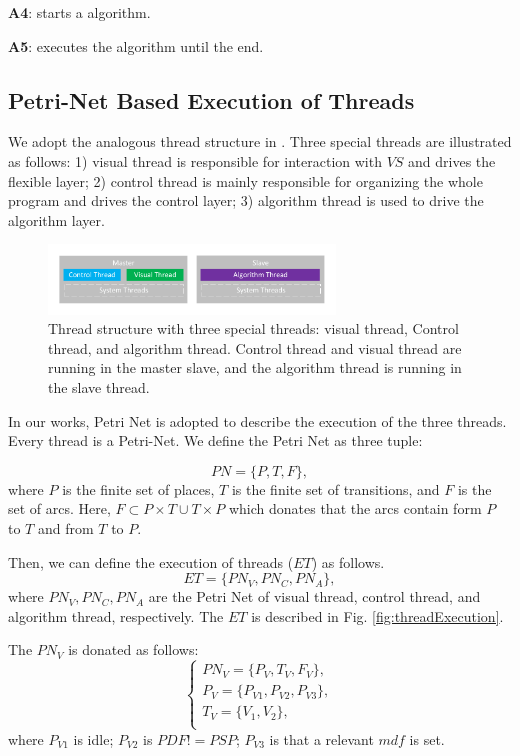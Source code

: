\documentclass[journal,UTF8]{IEEEtran}
\begin{document}
\textbf{A4}: starts a algorithm.

\textbf{A5}: executes the algorithm until the end. 

\subsection{Petri-Net Based Execution of Threads}
We adopt the analogous thread structure in \cite{wu2018customized}. Three special threads are illustrated as follows: 1) visual thread is responsible for interaction with $VS$ and drives the flexible layer; 2) control thread is mainly responsible for organizing the whole program and drives the control layer; 3) algorithm thread is used to drive the algorithm layer.

\begin{figure}
	\centering
	\includegraphics[width=3in]{fig/Threads.pdf}
	\caption{ Thread structure with three special threads: visual thread, Control thread, and algorithm thread. Control thread and visual thread are running in the master slave, and the algorithm thread is running in the slave thread.}
	\label{fig:Threads}
\end{figure}

  In our works, Petri Net is adopted to describe the execution of the three threads. Every thread is a Petri-Net. We define the Petri Net as three tuple:
 
 \begin{equation}
PN = \{P,T,F\},
 \end{equation} 
 where $P$ is the finite set of places, $T$ is the finite set of transitions, and $F$ is the set of arcs. Here, $F \subset P\times T \cup T\times P$ which donates that the arcs contain form $P$ to $T$ and from $T$ to $P$.
 
 Then, we can define the execution of threads ($ET$) as follows.
 \begin{equation}
ET = \{PN_V,PN_C,PN_A\},
\end{equation} 
where $PN_V,PN_C,PN_A$ are the Petri Net of visual thread, control thread, and algorithm thread, respectively. The $ET$ is described in Fig. \ref{fig:threadExecution}.

The $PN_V$ is donated as follows:
 \begin{equation}
\left\{
\begin{array}{l}
PN_V= \{P_V,T_V,F_V\},\\
P_V=\{P_{V1}, P_{V2}, P_{V3}\},\\
T_V=\{V_1,V_2\},\\
\end{array}
\right.
\end{equation} 
where $P_{V1}$ is idle; $P_{V2}$ is $PDF != PSP$; $P_{V3}$ is that a relevant $mdf$ is set.
\end{document}
